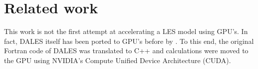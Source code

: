 \section{Related work}

This work is not the first attempt at accelerating a LES model using GPU's. In fact, DALES itself has been ported to GPU's before by \citet{schalkwijkHighPerformanceSimulationsTurbulent2012}. To this end, the original Fortran code of DALES was translated to C++ and calculations were moved to the GPU using NVIDIA's Compute Unified Device Architecture (CUDA). 

